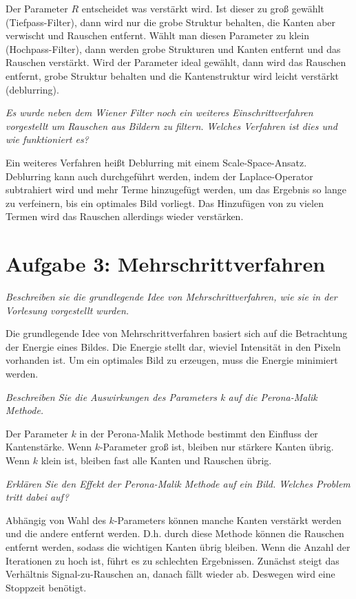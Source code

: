 \documentclass[
  ngerman,
  DIV=14
]{scrartcl}
\begin{document}
Der Parameter $R$ entscheidet was verstärkt wird. Ist dieser zu groß gewählt (Tiefpass-Filter), dann wird nur die grobe Struktur behalten, die Kanten aber verwischt und Rauschen entfernt. Wählt man diesen Parameter zu klein (Hochpass-Filter), dann werden grobe Strukturen und Kanten entfernt und das Rauschen verstärkt. Wird der Parameter ideal gewählt, dann wird das Rauschen entfernt, grobe Struktur behalten und die Kantenstruktur wird leicht verstärkt (deblurring).

\emph{Es wurde neben dem Wiener Filter noch ein weiteres Einschrittverfahren vorgestellt um Rauschen aus Bildern zu filtern. Welches Verfahren ist dies und wie funktioniert es?}

Ein weiteres Verfahren heißt Deblurring mit einem Scale-Space-Ansatz. Deblurring kann auch durchgeführt werden, indem der Laplace-Operator subtrahiert wird und mehr Terme hinzugefügt werden, um das Ergebnis so lange zu verfeinern, bis ein optimales Bild vorliegt. Das Hinzufügen von zu vielen Termen wird das Rauschen allerdings wieder verstärken.

\section*{Aufgabe 3: Mehrschrittverfahren}

\emph{Beschreiben sie die grundlegende Idee von Mehrschrittverfahren, wie sie in der Vorlesung vorgestellt wurden.}

Die grundlegende Idee von Mehrschrittverfahren basiert sich auf die Betrachtung der Energie eines Bildes. Die Energie stellt dar, wieviel Intensität in den Pixeln vorhanden ist. Um ein optimales Bild zu erzeugen, muss die Energie minimiert werden.

\emph{Beschreiben Sie die Auswirkungen des Parameters k auf die Perona-Malik Methode.}

Der Parameter $k$ in der Perona-Malik Methode bestimmt den Einfluss der Kantenstärke. Wenn $k$-Parameter groß ist, bleiben nur stärkere Kanten übrig. Wenn $k$ klein ist, bleiben fast alle Kanten und Rauschen übrig.

\emph{Erklären Sie den Effekt der Perona-Malik Methode auf ein Bild. Welches Problem tritt dabei auf?}

Abhängig von Wahl des $k$-Parameters können manche Kanten verstärkt werden und die andere entfernt werden. D.h. durch diese Methode können die Rauschen entfernt werden, sodass die wichtigen Kanten übrig bleiben.
Wenn die Anzahl der Iterationen zu hoch ist, führt es zu schlechten Ergebnissen. Zunächst steigt das Verhältnis Signal-zu-Rauschen an, danach fällt wieder ab. Deswegen wird eine Stoppzeit benötigt.
\end{document}

